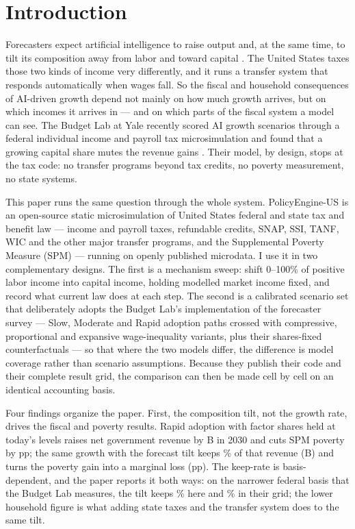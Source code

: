 \section{Introduction}\label{sec:intro}

Forecasters expect artificial intelligence to raise output and, at the same
time, to tilt its composition away from labor and toward capital
\citep{karger2026}. The United States taxes those two kinds of income very
differently, and it runs a transfer system that responds automatically when
wages fall. So the fiscal and household consequences of AI-driven growth
depend not mainly on how much growth arrives, but on which incomes it arrives
in --- and on which parts of the fiscal system a model can see. The Budget
Lab at Yale recently scored AI growth scenarios through a federal individual
income and payroll tax microsimulation and found that a growing capital share
mutes the revenue gains \citep{iselinnunn2026}. Their model, by design, stops
at the tax code: no transfer programs beyond tax credits, no poverty
measurement, no state systems.

This paper runs the same question through the whole system. PolicyEngine-US
is an open-source static microsimulation of United States federal and state
tax and benefit law --- income and payroll taxes, refundable credits, SNAP,
SSI, TANF, WIC and the other major transfer programs, and the Supplemental
Poverty Measure (SPM) --- running on openly published microdata. I use it in
two complementary designs. The first is a mechanism sweep: shift 0--100\% of
positive labor income into capital income, holding modelled market income
fixed, and record what current law does at each step. The second is a
calibrated scenario set that deliberately adopts the Budget Lab's
implementation of the \citet{karger2026} forecaster survey --- Slow, Moderate
and Rapid adoption paths crossed with compressive, proportional and expansive
wage-inequality variants, plus their shares-fixed counterfactuals --- so that
where the two models differ, the difference is model coverage rather than
scenario assumptions. Because they publish their code and their complete
result grid, the comparison can then be made cell by cell on an identical
accounting basis.

Four findings organize the paper. First, the composition tilt, not the growth
rate, drives the fiscal and poverty results. Rapid adoption with factor
shares held at today's levels raises net government revenue by
\genRapidFixedRev B in 2030 and cuts SPM poverty by
\genRapidFixedPovPp pp; the same growth with the forecast tilt keeps
\genKeptHouseholdRapidPct\% of that revenue (\genRapidPropRev B) and turns
the poverty gain into a marginal loss (\genRapidPropPovPp pp). The keep-rate
is basis-dependent, and the paper reports it both ways: on the narrower
federal basis that the Budget Lab measures, the tilt keeps
\genKeptMatchedRapidPct\% here and \genKeptTheirsRapidPct\% in their grid;
the lower household figure is what adding state taxes and the transfer
system does to the same tilt.

